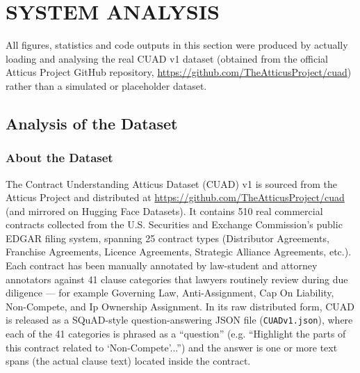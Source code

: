 \documentclass[12pt, a4paper]{report}
\begin{document}
\newpage

\chapter{SYSTEM ANALYSIS}
\label{ch:system_analysis}

All figures, statistics and code outputs in this section were produced by actually loading and analysing the real CUAD v1 dataset (obtained from the official Atticus Project GitHub repository, \url{https://github.com/TheAtticusProject/cuad}) rather than a simulated or placeholder dataset.

\section{Analysis of the Dataset}

\subsection{About the Dataset}
The Contract Understanding Atticus Dataset (CUAD) v1 is sourced from the Atticus Project and distributed at \url{https://github.com/TheAtticusProject/cuad} (and mirrored on Hugging Face Datasets). It contains 510 real commercial contracts collected from the U.S. Securities and Exchange Commission's public EDGAR filing system, spanning 25 contract types (Distributor Agreements, Franchise Agreements, Licence Agreements, Strategic Alliance Agreements, etc.). Each contract has been manually annotated by law-student and attorney annotators against 41 clause categories that lawyers routinely review during due diligence — for example Governing Law, Anti-Assignment, Cap On Liability, Non-Compete, and Ip Ownership Assignment. In its raw distributed form, CUAD is released as a SQuAD-style question-answering JSON file (\texttt{CUADv1.json}), where each of the 41 categories is phrased as a ``question'' (e.g. ``Highlight the parts of this contract related to ‘Non-Compete’...'') and the answer is one or more text spans (the actual clause text) located inside the contract.
\end{document}
